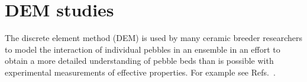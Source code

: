 \chapter{DEM studies}\label{sec:dem-studies}
The discrete element method (DEM) is used by many ceramic breeder researchers to model the interaction of individual pebbles in an ensemble in an effort to obtain a more detailed understanding of pebble beds than is possible with experimental measurements of effective properties. For example see Refs.~\cite{An20071393, Lu2000, Zhao2010, Gan2010a, Annabattula2012a, VanLew2014}.




